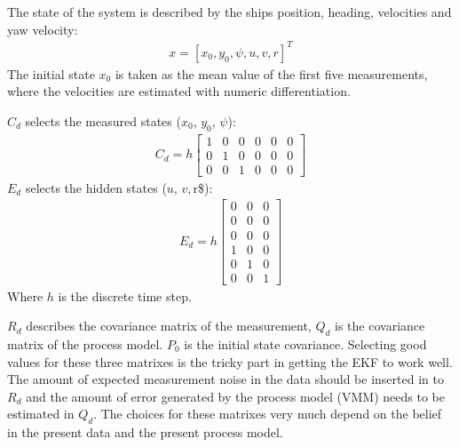 \documentclass[review]{elsarticle}
\begin{document}
\sphinxAtStartPar
The state of the system is described by the ships position, heading, velocities and yaw velocity:
\begin{equation}\label{equation:04.01_EK:eqstates}
\begin{split}x = [x_0,y_0,\psi,u,v,r]^T\end{split}
\end{equation}
\sphinxAtStartPar
The initial state \(x_0\) is taken as the mean value of the first five measurements, where the velocities are estimated with numeric differentiation.

\sphinxAtStartPar
\(C_d\) selects the measured states (\(x_0\), \(y_0\), \(\psi\)):
\begin{equation}\label{equation:04.01_EK:eqcd}
\begin{split}\displaystyle C_{d} = h \left[\begin{matrix}1 & 0 & 0 & 0 & 0 & 0\\0 & 1 & 0 & 0 & 0 & 0\\0 & 0 & 1 & 0 & 0 & 0\end{matrix}\right]\end{split}
\end{equation}
\sphinxAtStartPar
\(E_d\) selects the hidden states (\(u\), \(v, \)r\$):
\begin{equation}\label{equation:04.01_EK:eqed}
\begin{split}\displaystyle E_{d} = h \left[\begin{matrix}0 & 0 & 0\\0 & 0 & 0\\0 & 0 & 0\\1 & 0 & 0\\0 & 1 & 0\\0 & 0 & 1\end{matrix}\right]\end{split}
\end{equation}
\sphinxAtStartPar
Where \(h\) is the discrete time step.

\sphinxAtStartPar
\(R_d\) describes the covariance matrix of the measurement, \(Q_d\) is the covariance matrix of the process model. \(P_0\) is the initial state covariance.
Selecting good values for these three matrixes is the tricky part in getting the EKF to work well. The amount of expected measurement noise in the data should be inserted in to \(R_d\) and the amount of error generated by the process model (VMM) needs to be estimated in \(Q_d\). The choices for these matrixes very much depend on the belief in the present data and the present process model.
\end{document}
